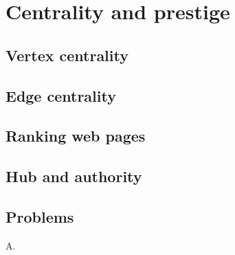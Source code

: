 
\chapter{Centrality and prestige}
\label{chap:centrality_prestige}



\section{Vertex centrality}



\section{Edge centrality}



\section{Ranking web pages}



\section{Hub and authority}



\section{Problems}

\begin{problem}
\item A.
\end{problem}

